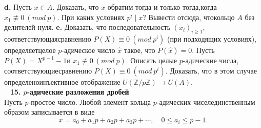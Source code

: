 \documentclass{mai_book}
\begin{document}
\hspace*{15pt}\textbf{d.} Пусть $x \in A$. Доказать, что $x$ обратим тогда и только тогда,\newline когда $x_1\not\equiv 0\ (mod\ p)$. При каких условиях $p^i\mid x$? Вывести отсюда, что\newline кольцо $A$ без делителей нуля.\newline
\hspace*{15pt}\textbf{e.} Доказать, что последовательность $(x_i)_{i\geqslant1}$, соответствующая\newline сравнению  $P(X)\equiv 0\ (mod\ p^i)$ (при подходящих условиях), определяет\newline целое $p$-адическое число $\hat x$ такое, что $P(\hat x)=0$. Пусть $P(X)=X^{p-1}-1$\newline и $x_1\not\equiv 0\ (mod\ p)$. Описать целые $p$-адические числа, соответствующие\newline сравнению $P(X)\equiv0\ (mod\ p^i)$. Доказать, что в этом случае определено\newline инъективное отображение $U(\mathbb{Z}/p\mathbb{Z}) \rightarrow U(A)$.\\
\ \newline
\noindent\textbf{15. $p$-адические разложения дробей}\\

    Пусть $p$-простое число. Любой элемент кольца $p$-адических чисел\newline единственным образом записывается в виде 
    $$
    x=a_0+a_1p+a_2p+a_3p+\cdots ,\quad   0\leqslant a_i\leqslant p-1.   
    $$
\newline
\newpage
\end{document}

